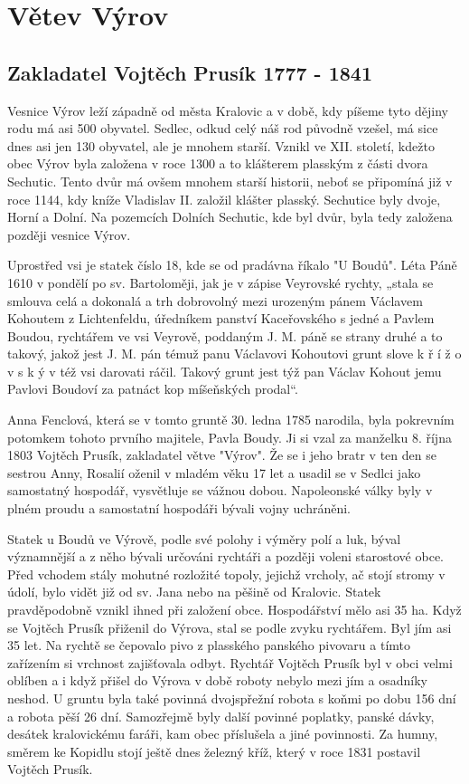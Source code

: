 \documentclass[../dejiny-rodu-prusiku.tex]{subfiles}
\begin{document}
\chapter{Větev Výrov}

\section{Zakladatel Vojtěch Prusík 1777 - 1841}
Vesnice Výrov leží západně od města Kralovic a v době, kdy píšeme tyto dějiny rodu má asi 500 obyva­tel. Sedlec, odkud celý náš rod původně vzešel, má sice dnes asi jen 130 obyvatel, ale je mnohem starší. Vznikl ve XII. století, kdežto obec Výrov byla zalo­žena v roce 1300 a to klášterem plasským z části dvora Sechutic. Tento dvůr má ovšem mnohem starší historii, neboť se připomíná již v roce 1144, kdy kníže Vladislav II. založil klášter plasský. Sechutice byly dvoje, Horní a Dolní. Na pozemcích Dolních Sechutic, kde byl dvůr, byla tedy založena později vesnice Výrov.

Uprostřed vsi je statek číslo 18, kde se od pradávna říkalo "U Boudů".  Léta Páně 1610 v pondělí po sv. Bartoloměji, jak je v zápise Veyrovské rychty, „stala se smlouva celá a dokonalá a trh dobrovolný mezi urozeným pánem Václavem Kohoutem z Lichtenfeldu, úřední­kem panství Kaceřovského s jedné a Pavlem Boudou, rychtářem ve vsi Veyrově, poddaným J. M. páně se strany druhé a to takový, jakož jest J. M. pán témuž panu Václavovi Kohoutovi grunt slove k ř í ž o v s k ý v též vsi darovati ráčil. Takový grunt jest týž pan Václav Kohout je­mu Pavlovi Boudoví za patnáct kop míšeňských prodal“.

Anna Fenclová, která se v tomto gruntě 30. ledna 1785 na­rodila, byla pokrevním potomkem tohoto prvního majitele, Pavla Boudy. Ji si vzal za manželku 8. října 1803 Vojtěch Prusík, zakladatel větve "Výrov". Že se i jeho bratr v ten den se sestrou Anny, Rosalií oženil v mladém věku 17 let a usadil se v Sedlci jako samostatný hospo­dář, vysvětluje se vážnou dobou. Napoleonské války byly v plném proudu a samostatní hospodáři bývali vojny uchráněni.

Statek u Boudů ve Výrově, podle své polohy i výměry polí a luk, býval významnější a z něho bývali určováni rychtáři a později voleni starostové obce. Před vchodem stály mohutné rozložité topoly, jejichž vrcholy, ač stojí stromy v údolí, bylo vidět již od sv. Jana nebo na pěšině od Kralovic. Statek pravděpodobně vznikl ihned při založení obce. Hospodářství mělo asi 35 ha. Když se Vojtěch Prusík přiženil do Výrova, stal se podle zvyku rychtářem. Byl jím asi 35 let. Na rychtě se čepovalo pivo z plasského panského pivovaru a tímto zařízením si vrchnost zajišťovala odbyt. Rychtář Vojtěch Prusík byl v obci velmi oblíben a i když přišel do Výrova v do­bě roboty nebylo mezi jím a osadníky neshod. U gruntu byla také povinná dvojspřežní robota s koňmi po dobu 156 dní a robota pěší 26 dní. Samozřejmě byly další povinné poplatky, panské dávky, desátek kralovickému faráři, kam obec příslušela a jiné povinnosti. Za humny, směrem ke Kopidlu stojí ještě dnes železný kříž, který v roce 1831 postavil Vojtěch Prusík.
\end{document}
